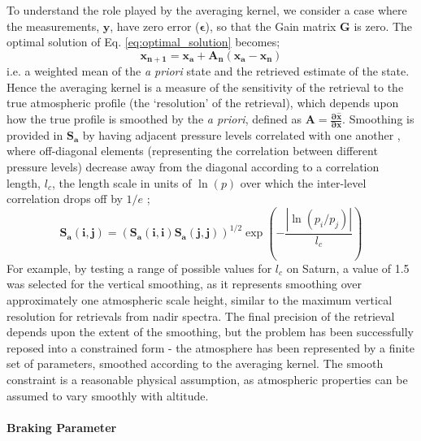 \documentclass[final,5p,times,twocolumn,authoryear]{elsarticle}
\newcommand{\pderiv}[2]{\frac{\partial #1}{\partial #2}}
\begin{document}
To understand the role played by the averaging kernel, we consider a case where the measurements, $\mathbf{y}$, have zero error ($\mathbf{\epsilon}$), so that the Gain matrix $\mathbf{G}$ is zero.  The optimal solution of Eq. \ref{eq:optimal_solution} becomes;
\begin{equation}
\mathbf{x_{n+1}} = \mathbf{x_a} + \mathbf{A_n(x_a-x_n)}
\end{equation}
i.e. a weighted mean of the \textit{a priori} state and the retrieved estimate of the state.  Hence the averaging kernel is a measure of the sensitivity of the retrieval to the true atmospheric profile (the `resolution' of the retrieval), which depends upon how the true profile is smoothed by the \textit{a priori}, defined as $\mathbf{A=\pderiv{\hat{x}}{x}}$.  Smoothing is provided in $\mathbf{S_a}$ by having adjacent pressure levels correlated with one another \citep{00rodgers, 98conrath}, where off-diagonal elements (representing the correlation between different pressure levels) decrease away from the diagonal according to a correlation length, $l_c$, the length scale in units of $\ln(p)$ over which the inter-level correlation drops off by $1/e$ \citep[p.55,][]{00rodgers};
\begin{equation}
\mathbf{S_a(i,j)}=(\mathbf{S_a(i,i)S_a(j,j)})^{1/2}\exp{\left(-\frac{\left|\ln(p_i/p_j)\right|}{l_c}\right)}
\end{equation}
For example, by testing a range of possible values for $l_c$ on Saturn, a value of 1.5 was selected for the vertical smoothing, as it represents smoothing over approximately one atmospheric scale height, similar to the maximum vertical resolution for retrievals from nadir spectra.  The final precision of the retrieval depends upon the extent of the smoothing, but the problem has been successfully reposed into a constrained form - the atmosphere has been represented by a finite set of parameters, smoothed according to the averaging kernel. The smooth constraint is a reasonable physical assumption, as atmospheric properties can be assumed to vary smoothly with altitude.

\paragraph{Braking Parameter}
\end{document}
